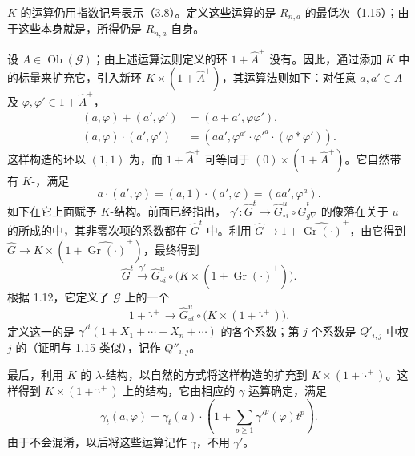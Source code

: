 $K$ 的运算仍用指数记号表示（3.8）。定义这些运算的是 $R_{n,a}$ 的最低次（1.15）；由于这些本身就是，所得仍是 $R_{n,a}$ 自身。

设 $A\in\operatorname{Ob}(\mathscr G)$；由上述运算法则定义的环 $1+\widehat A^+$ 没有。因此，通过添加 $K$ 中的标量来扩充它，引入新环 $K\times(1+\widehat A^+)$，其运算法则如下：对任意 $a,a'\in A$ 及 $\varphi,\varphi'\in1+\widehat A^+$，
\[
\begin{aligned}
(a,\varphi)+(a',\varphi')&=(a+a',\varphi\varphi'),\\
(a,\varphi)\cdot(a',\varphi')
 &=(aa',\varphi^{a'}\cdot\varphi'^{a}\cdot(\varphi*\varphi')).
\end{aligned}
\tag{6.1.2}
\]
这样构造的环以 $(1,1)$ 为，而 $1+\widehat A^+$ 可等同于 $(0)\times(1+\widehat A^+)$。它自然带有 $K$-，满足
\[
a\cdot(a',\varphi)=(a,1)\cdot(a',\varphi)
 =(aa',\varphi^a).
\tag{6.1.3}
\]
如下在它上面赋予 $K$-结构。前面已经指出，
$\gamma':\widehat G^t\longrightarrow\widehat G^u_{\circ i}\circ\widehat G^t_{g\nabla}$ 的像落在关于 $u$ 的所成的中，其非零次项的系数都在 $\widehat G^t$ 中。利用
$\widehat G\longrightarrow1+\widehat{\operatorname{Gr}(\cdot)}^+$，由它得到
$\widehat G\longrightarrow K\times(1+\widehat{\operatorname{Gr}(\cdot)}^+)$，最终得到
\[
\widehat G^t\xrightarrow{\gamma'}
\widehat G^u_{\circ i}\circ
 \bigl(K\times(1+\widehat{\operatorname{Gr}(\cdot)}^+)\bigr).
\]
根据 1.12，它定义了 $\mathscr G$ 上的一个
\[
1+\widehat{\cdot}^{+}\longrightarrow
\widehat G^u_{\circ i}\circ\bigl(K\times(1+\widehat{\cdot}^{+})\bigr).
\]
定义这一的是
$\gamma'^i(1+X_1+\cdots+X_n+\cdots)$ 的各个系数；第 $j$ 个系数是 $Q'_{i,j}$ 中权 $j$ 的（证明与 1.15 类似），记作 $Q''_{i,j}$。

最后，利用 $K$ 的 $\lambda$-结构，以自然的方式将这样构造的扩充到 $K\times(1+\widehat{\cdot}^{+})$。这样得到 $K\times(1+\widehat{\cdot}^{+})$ 上的结构，它由相应的 $\gamma$ 运算确定，满足
\[
\gamma_t(a,\varphi)=\gamma_t(a)\cdot
 \left(1+\sum_{p\geqslant1}\gamma'^p(\varphi)t^p\right).
\tag{6.1.4}
\]
由于不会混淆，以后将这些运算记作 $\gamma$，不用 $\gamma'$。

